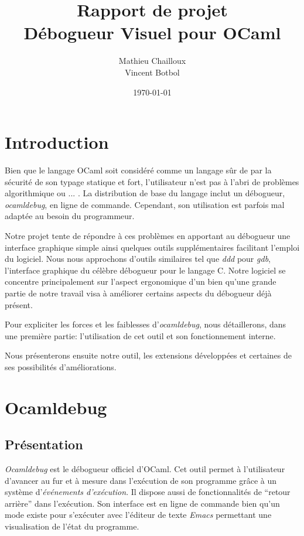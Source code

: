 \documentclass[11pt,a4paper]{report}
\title{Rapport de projet\\Débogueur Visuel pour OCaml}
\author{Mathieu Chailloux\\Vincent Botbol}
\date\today
\begin{document}
\maketitle

\chapter{Introduction}

Bien que le langage OCaml soit considéré comme un langage sûr de par la sécurité de son typage statique et fort, %
l'utilisateur n'est pas à l'abri de problèmes algorithmique ou ... . La distribution de base du langage inclut %
un débogueur, \emph{ocamldebug}, en ligne de commande. Cependant, son utilisation est parfois mal adaptée au besoin du programmeur.

Notre projet tente de répondre à ces problèmes en apportant au débogueur une interface graphique simple ainsi quelques
outils supplémentaires facilitant l'emploi du logiciel. Nous nous approchons d'outils similaires
tel que \emph{ddd} pour \emph{gdb}, l'interface graphique du célèbre débogueur pour le langage C. Notre logiciel se concentre
principalement sur l'aspect ergonomique d'un  bien qu'une grande partie de notre travail visa à améliorer certains
aspects du débogueur déjà présent.

Pour expliciter les forces et les faiblesses d'\emph{ocamldebug}, nous détaillerons, dans une première partie:
l'utilisation de cet outil et son fonctionnement interne.

Nous présenterons ensuite notre outil, les extensions développées et certaines de ses possibilités d'améliorations.

\chapter{Ocamldebug}

\section{Présentation}

\emph{Ocamldebug} est le débogueur officiel d'OCaml. Cet outil permet à l'utilisateur d'avancer au fur et à mesure
dans l'exécution de son programme grâce à un système d'\emph{événements d'exécution}. Il dispose aussi de
fonctionnalités de ``retour arrière'' dans l'exécution. Son interface est en ligne de commande bien qu'un mode existe 
pour s'exécuter avec l'éditeur de texte \emph{Emacs} permettant une visualisation de l'état du programme.
\end{document}
